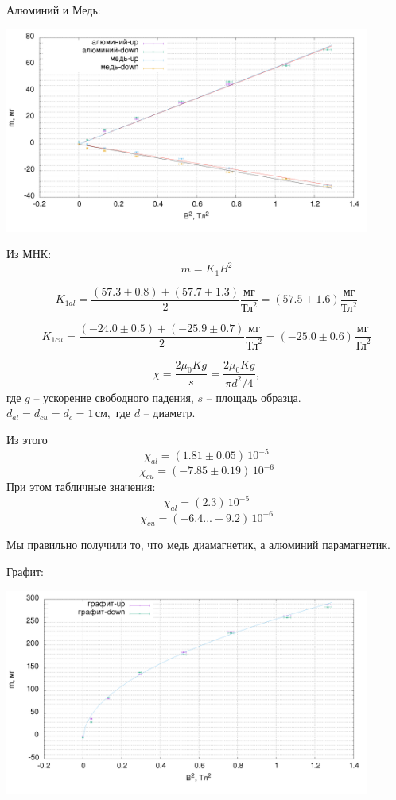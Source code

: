 \documentclass[a4paper,12pt]{article}
\begin{document}
\newpage
Алюминий и Медь:
\begin{center}
\includegraphics[width=0.90\textwidth]{al-cu.png}
\end{center}

Из МНК:
$$m = K_1 B^2$$

$$K_{1al} = \frac{(57.3\pm0.8) + (57.7\pm1.3)}{2}\frac{\text{мг}}{\text{Тл}^2}=(57.5\pm1.6)\frac{\text{мг}}{\text{Тл}^2}$$

$$K_{1cu} = \frac{(-24.0\pm0.5) + (-25.9\pm0.7)}{2}\frac{\text{мг}}{\text{Тл}^2}=(-25.0\pm0.6)\frac{\text{мг}}{\text{Тл}^2}$$

$$\chi = \frac{2 \mu_0 K g} {s} = \frac{2 \mu_0 K g} {\pi d^2/4} ,$$
где $g$ -- ускорение свободного падения, $s$ -- площадь образца. $d_{al}=d_{cu}=d_{c}=1\,\text{см},$ где $d$ -- диаметр.

Из этого
$$\chi_{al} = (1.81\pm0.05)\,10^{-5}$$
$$\chi_{cu} = (-7.85\pm0.19)\,10^{-6}$$
При этом табличные значения:
$$\chi_{al} = (2.3)\,10^{-5}$$
$$\chi_{cu} = (-6.4...-9.2)\,10^{-6}$$

Мы правильно получили то, что медь диамагнетик, а алюминий парамагнетик.

\newpage

Графит:
\begin{center}
\includegraphics[width=0.90\textwidth]{c.png}
\end{center}
\end{document}
